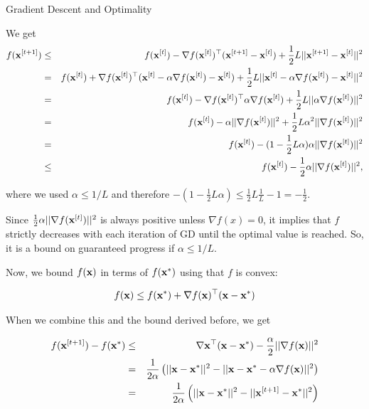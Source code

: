 \documentclass[11pt,compress,t,notes=noshow, xcolor=table]{beamer}
\begin{document}
\begin{vbframe}{Gradient Descent and Optimality}
\begin{footnotesize}
	We get
	\vspace*{-0.3cm}
	\begin{eqnarray*}
	f(\mathbf{x}^{[t+1]}) &\leq& f(\mathbf{x}^{[t]}) - \nabla f(\mathbf{x}^{[t]})^\top(\mathbf{x}^{[t+1]} - \mathbf{x}^{[t]}) + \frac{1}{2}L ||\mathbf{x}^{[t+1]} - \mathbf{x}^{[t]}||^2 \\
	&=& f(\mathbf{x}^{[t]}) + \nabla f(\mathbf{x}^{[t]})^\top(\mathbf{x}^{[t]} - \alpha \nabla f(\mathbf{x}^{[t]}) - \mathbf{x}^{[t]}) + \frac{1}{2}L ||\mathbf{x}^{[t]} - \alpha \nabla f(\mathbf{x}^{[t]}) - \mathbf{x}^{[t]}||^2 \\
	& = & f(\mathbf{x}^{[t]}) - \nabla f(\mathbf{x}^{[t]})^\top \alpha  \nabla f(\mathbf{x}^{[t]}) + \frac{1}{2}L ||\alpha \nabla f(\mathbf{x}^{[t]})||^2 \\
	&=& f(\mathbf{x}^{[t]}) - \alpha ||\nabla f(\mathbf{x}^{[t]})||^2 + \frac{1}{2}L\alpha^2 ||\nabla f(\mathbf{x}^{[t]})||^2 \\
	&=& f(\mathbf{x}^{[t]}) - (1 - \frac{1}{2} L \alpha)\alpha  ||\nabla f(\mathbf{x}^{[t]})||^2 \\
	&\le& f(\mathbf{x}^{[t]}) - \frac{1}{2}\alpha ||\nabla f(\mathbf{x}^{[t]})||^2, 
	\end{eqnarray*}

	where we used $\alpha \leq 1/L$ and therefore $- (1 - \frac{1}{2} L \alpha) \leq \frac{1}{2} L \frac{1}{L} -1 = -\frac{1}{2}$.
				
	Since $\frac{1}{2} \alpha ||\nabla f(\mathbf{x}^{[t]})||^2$ is always positive unless $\nabla f(x) = 0$, it implies that $f$ strictly decreases with each iteration of GD until the optimal value is reached. So, it is a bound on guaranteed progress if $\alpha \leq 1/L$. 
	\end{footnotesize}
	
	\framebreak
	
			Now, we bound $f(\mathbf{x})$ in terms of $f(\mathbf{x}^\ast)$ using that $f$ is convex: 
			
			$$
			f(\mathbf{x}) \leq f(\mathbf{x}^\ast) + \nabla f(\mathbf{x})^\top (\mathbf{x} - \mathbf{x}^\ast)
			$$ 
			
			When we combine this and the bound derived before, we get
			
			\begin{eqnarray*}
				f(\mathbf{x}^{[t+1]}) - f(\mathbf{x}^\ast) &\leq& \nabla \mathbf{x}^\top (\mathbf{x}-\mathbf{x}^*) - \frac{\alpha}{2}||\nabla f(\mathbf{x})||^2 \\
				&=& \frac{1}{2 \alpha} \left( ||\mathbf{x}-\mathbf{x}^\ast||^2 - || \mathbf{x} - \mathbf{x}^\ast - \alpha \nabla f(\mathbf{x})||^2 \right) \\
				&=& \frac{1}{2 \alpha} \left( ||\mathbf{x}-\mathbf{x}^\ast||^2 - || \mathbf{x}^{[t+1]} - \mathbf{x}^\ast ||^2 \right)
			\end{eqnarray*}
		

\end{vbframe}
\end{document}
